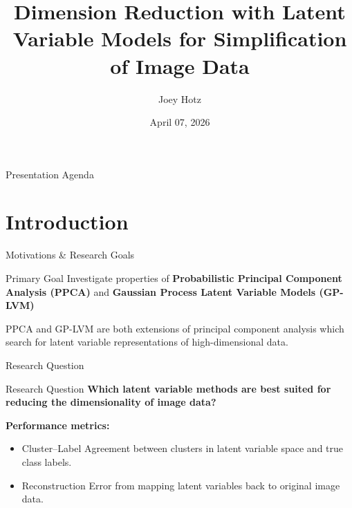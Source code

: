 \documentclass[dvipsnames]{beamer}
\title[Dimension Reduction with Latent Variables]{Dimension Reduction with Latent Variable Models for Simplification of Image Data}
\author[Joey Hotz]{Joey Hotz}
\institute[]{Department of Statistical Sciences, University of Toronto}
\date[April 2026]{April 07, 2026}
\begin{document}
\begin{frame}
    \maketitle
\end{frame}

\begin{frame}{Presentation Agenda}
    \footnotesize \tableofcontents
\end{frame}

\section{Introduction}
\begin{frame}{Motivations \& Research Goals}
    \begin{block}{Primary Goal}
        Investigate properties of \textbf{Probabilistic Principal Component Analysis (PPCA)} and \textbf{Gaussian Process Latent Variable Models (GP-LVM)}
    \end{block}

    \bigskip

    PPCA \citep{PPCA-1999} and GP-LVM \citep{GPLVM-2005} are both extensions of principal component analysis which search for latent variable representations of high-dimensional data.
\end{frame}

\begin{frame}{Research Question}
    \begin{block}{Research Question}
        \textbf{Which latent variable methods are best suited for reducing the dimensionality of image data?}
    \end{block}
  \bigskip

  \textbf{Performance metrics:}
  \begin{itemize}[label=]
    \item \alert{Cluster–Label Agreement} between clusters in latent variable space and true class labels.
    \item \alert{Reconstruction Error} from mapping latent variables back to original image data.
  \end{itemize}
\end{frame}
\end{document}

